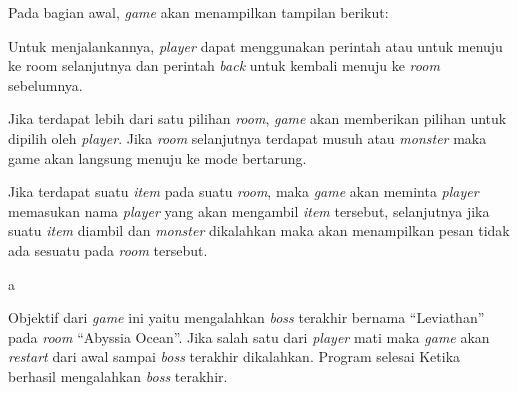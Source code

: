 \documentclass[../main.tex]{subfiles}
\begin{document}
Pada bagian awal, \textit{game} akan menampilkan tampilan berikut:


Untuk menjalankannya, \textit{player} dapat menggunakan perintah  atau  untuk menuju ke room selanjutnya dan perintah \textit{back} untuk kembali menuju ke \textit{room} sebelumnya.


Jika terdapat lebih dari satu pilihan \textit{room}, \textit{game} akan memberikan pilihan untuk dipilih oleh \textit{player}. Jika \textit{room} selanjutnya terdapat musuh atau \textit{monster} maka game akan langsung menuju ke mode bertarung.


Jika terdapat suatu \textit{item} pada suatu \textit{room}, maka \textit{game} akan meminta \textit{player} memasukan nama \textit{player} yang akan mengambil \textit{item} tersebut, selanjutnya jika suatu \textit{item} diambil dan \textit{monster} dikalahkan maka akan menampilkan pesan tidak ada sesuatu pada \textit{room} tersebut.

\newpage
{\color{white}a\vspace*{-1.5ex}}

Objektif dari \textit{game} ini yaitu mengalahkan \textit{boss} terakhir bernama “Leviathan” pada \textit{room} “Abyssia Ocean”. Jika salah satu dari \textit{player} mati maka \textit{game} akan \textit{restart} dari awal sampai \textit{boss} terakhir dikalahkan. Program selesai Ketika berhasil mengalahkan \textit{boss} terakhir.
\end{document}
